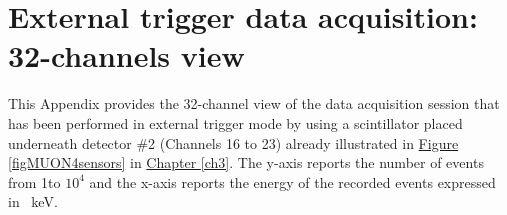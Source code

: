 \chapter[External trigger data acquisition: 32-channels view]{External trigger data acquisition: 32-channels view} \label{appendix32CHmuons}

This Appendix provides the 32-channel view of the data acquisition session that has been performed in external trigger mode by using a scintillator placed underneath detector \#2 (Channels 16 to 23) already illustrated in \hyperref[figMUON4sensors]{Figure \ref{figMUON4sensors}} in \hyperref[ch3]{Chapter \ref{ch3}}. The y-axis reports the number of events from 1to $10^{4}$ and the x-axis reports the energy of the recorded events expressed in \SI{}{\kilo\electronvolt}.

